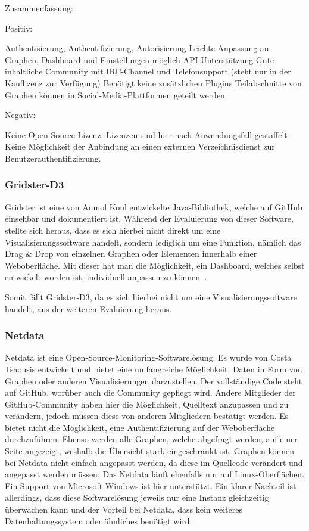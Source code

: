 Zusammenfassung:

Positiv:

\begin{outline}
  \1 Authentisierung, Authentifizierung, Autorisierung
  \1 Leichte Anpassung an Graphen, Dashboard und Einstellungen möglich
  \1 API-Unterstützung
  \1 Gute inhaltliche Community mit IRC-Channel und Telefonsupport (steht
  nur in der Kauflizenz zur Verfügung)
  \1 Benötigt keine zusätzlichen Plugins
  \1 Teilabschnitte von Graphen können in Social-Media-Plattformen geteilt
  werden
\end{outline}

Negativ:

\begin{outline}
  \1 Keine Open-Source-Lizenz. Lizenzen sind hier nach Anwendungsfall
  gestaffelt
  \1 Keine Möglichkeit der Anbindung an einen externen Verzeichnisdienst zur
  Benutzerauthentifizierung.
\end{outline}

\subsubsection{Gridster-D3}
\label{subsubsec:gridster-d3}
Gridster ist eine von Anmol Koul entwickelte Java-Bibliothek, welche auf
\gls{GitHub} einsehbar und dokumentiert ist. Während der Evaluierung von dieser
Software, stellte sich heraus, dass es sich hierbei nicht direkt um eine
Visualisierungssoftware handelt, sondern lediglich um eine Funktion, nämlich
das Drag \& Drop von einzelnen Graphen oder Elementen innerhalb einer
Weboberfläche. Mit dieser hat man die Möglichkeit, ein Dashboard, welches
selbst entwickelt worden ist, individuell anpassen zu
können~\cite{gridster-d3}.

Somit fällt Gridster-D3, da es sich hierbei nicht um eine
Visualisierungssoftware handelt, aus der weiteren Evaluierung heraus.

\subsubsection{Netdata}
\label{subsubsec:netdata}
Netdata ist eine Open-Source-Monitoring-Softwarelösung. Es wurde von Costa
Tsaousis entwickelt und bietet eine umfangreiche Möglichkeit, Daten in Form von
Graphen oder anderen Visualisierungen darzustellen. Der vollständige Code steht
auf GitHub, worüber auch die Community gepflegt wird. Andere Mitglieder der
GitHub-Community haben hier die Möglichkeit, Quelltext anzupassen und zu
verändern, jedoch müssen diese von anderen Mitgliedern bestätigt werden. Es
bietet nicht die Möglichkeit, eine Authentifizierung auf der Weboberfläche
durchzuführen. Ebenso werden alle Graphen, welche abgefragt werden, auf einer
Seite angezeigt, weshalb die Übersicht stark eingeschränkt ist. Graphen können
bei Netdata nicht einfach angepasst werden, da diese im Quellcode verändert und
angepasst werden müssen. Das Netdata läuft ebenfalls nur auf Linux-Oberflächen.
Ein Support von Microsoft Windows ist hier unterstützt. Ein klarer Nachteil ist
allerdings, dass diese Softwarelösung jeweils nur eine Instanz gleichzeitig
überwachen kann und der Vorteil bei Netdata, dass kein weiteres
Datenhaltungssystem oder ähnliches benötigt wird~\cite{netdata}.

